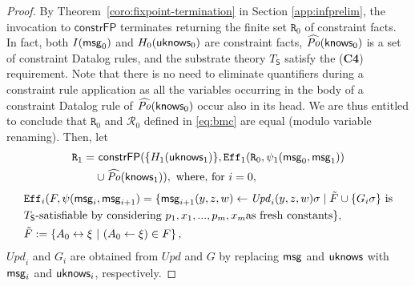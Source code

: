 \documentclass[conference]{llncs}
\newcommand{\know}{\ensuremath \mathsf{knows}}
\newcommand{\msg}{\ensuremath \mathsf{msg}}
\newcommand{\knowzero}{\ensuremath \mathsf{uknows}}
\begin{document}
{\begin{proof}
By Theorem~\ref{coro:fixpoint-termination} in Section \ref{app:infprelim}, the invocation to
  $\mathsf{constrFP}$ terminates returning the finite set
  $\mathtt{R}_0$ of constraint facts.  
  In fact, both $I(\msg_0)$ and $H_0(\knowzero_0)$ are constraint facts,
  $\widehat{\mathit{Po}}(\know_0)$ is a set of constraint Datalog rules,
  and the substrate theory $T_{\mathsf{S}}$ satisfy the (\textbf{C4}) requirement.  
  Note that there is no need to eliminate quantifiers during a constraint rule application as all the variables
  occurring in the body of a constraint Datalog rule of
  $\widehat{\mathit{Po}}(\know_0)$ occur also in its head.  We are
  thus entitled to conclude that $\mathtt{R}_0$ and $\mathcal{R}_0$
  defined in \eqref{eq:bmc} are equal (modulo variable
  renaming).  Then, let
  \begin{align*}
    \mathtt{R}_1 = &~ \mathsf{constrFP}(\{H_1(\knowzero_1)\}, \mathtt{Eff}_1(\mathtt{R}_0,\psi_1(\msg_0,\msg_1)) \\
    & \cup \widehat{\mathit{Po}}(\know_1)), \text{ where, for }i=0,
  \end{align*}
 \begin{align*}
  & \mathtt{Eff}_i(F,\psi(\msg_i,\msg_{i+1}) = \{\msg_{i+1}(y,z,w) \leftarrow \mathit{Upd}_i(y,z,w)\sigma \mid \tilde{F}\cup \{G_i\sigma\} \text{ is} \\
   & \text{$T_{\mathsf{S}}$-satisfiable by considering $p_1, x_1, ..., p_m, x_m$} \text{as fresh constants}\}, \\
  & \tilde{F} := \{ A_0\leftrightarrow \xi ~|~ (A_0\leftarrow \xi)\in F \}\,,
  \end{align*}
  $\mathit{Upd}_i$ and $G_i$ are obtained from $\mathit{Upd}$ and $G$
  by replacing $\msg$ and $\knowzero$ with $\msg_i$ and $\knowzero_i$,
  respectively.  
  

\end{proof}}
\end{document}

